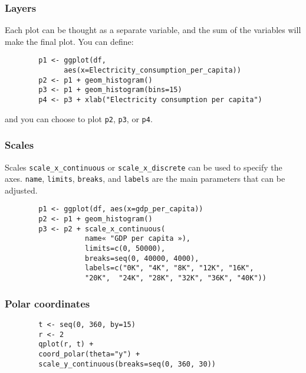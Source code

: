 \documentclass{beamer}
\begin{document}
	\begin{frame}[fragile]
		\frametitle{Layers}

		Each plot can be thought as a separate variable, and the sum of the variables will make the final plot. You can define:

		\begin{exampleblock}{}
		\begin{center}
		\begin{BVerbatim}
		p1 <- ggplot(df,
		      aes(x=Electricity_consumption_per_capita))
		p2 <- p1 + geom_histogram()
		p3 <- p1 + geom_histogram(bins=15)
		p4 <- p3 + xlab("Electricity consumption per capita")
		\end{BVerbatim}
		\end{center}
		\end{exampleblock}{}

		and you can choose to plot \verb|p2|, \verb|p3|, or \verb|p4|.

	\end{frame}

	\begin{frame}[fragile]
		\frametitle{Scales}

		Scales \verb|scale_x_continuous| or \verb|scale_x_discrete| can be used to specify the axes. \verb|name|, \verb|limits|, \verb|breaks|, and \verb|labels| are the main parameters that can be adjusted.

		\begin{exampleblock}{}
		\begin{center}
		\begin{BVerbatim}
		p1 <- ggplot(df, aes(x=gdp_per_capita))
		p2 <- p1 + geom_histogram()
		p3 <- p2 + scale_x_continuous(
		           name« "GDP per capita »),
		           limits=c(0, 50000),
		           breaks=seq(0, 40000, 4000),
		           labels=c("0K", "4K", "8K", "12K", "16K",
		           "20K",  "24K", "28K", "32K", "36K", "40K"))
		\end{BVerbatim}
		\end{center}
		\end{exampleblock}{}

	\end{frame}

	\begin{frame}[fragile]
		\frametitle{Polar coordinates}

		\begin{exampleblock}{}
		\begin{center}
		\begin{BVerbatim}
		t <- seq(0, 360, by=15)
		r <- 2
		qplot(r, t) +
		coord_polar(theta="y") +
		scale_y_continuous(breaks=seq(0, 360, 30))
		\end{BVerbatim}
		\end{center}
		\end{exampleblock}{}

	\end{frame}
		
\end{document}
